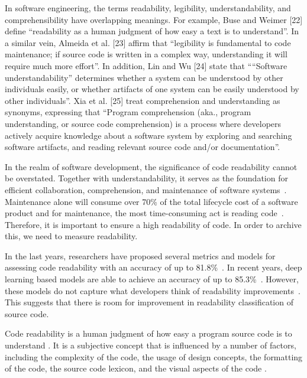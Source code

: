 \documentclass[%
class=scrreprt,
chapterprefix=false,%
open=right,%
twoside=false,%
paper=a4,%
logofile={Logo\_zentral\_farbig\_EN.png},%
thesistype=master,%
UKenglish,%
]{se2thesis}
\begin{document}
	In software engineering, the terms readability, legibility, understandability, and comprehensibility have overlapping meanings. For example, Buse and Weimer [22] define “readability
	as a human judgment of how easy a text is to understand”.
	In a similar vein, Almeida et al. [23] affirm that “legibility is
	fundamental to code maintenance; if source code is written
	in a complex way, understanding it will require much more
	effort”. In addition, Lin and Wu [24] state that ““Software
	understandability” determines whether a system can be understood by other individuals easily, or whether artifacts of
	one system can be easily understood by other individuals”.
	Xia et al. [25] treat comprehension and understanding as
	synonyms, expressing that “Program comprehension (aka.,
	program understanding, or source code comprehension) is a
	process where developers actively acquire knowledge about a
	software system by exploring and searching software artifacts,
	and reading relevant source code and/or documentation”.\cite{oliveira2020evaluating}
	
	
	In the realm of software development, the significance of code readability cannot be overstated. Together with understandability, it serves as the foundation for efficient collaboration, comprehension, and maintenance of software systems~\cite{posnett2011simpler, aggarwal2002integrated}. 
	Maintenance alone will consume over 70\% of the total lifecycle cost of a software product and for maintenance, the most time-consuming act is reading code~\cite{buse2009learning, deimel1985uses, rugaber2000use, boehm2001defect}.
	Therefore, it is important to ensure a high readability of code. In order to archive this, we need to measure readability.
	
	In the last years, researchers have proposed several metrics and models for assessing code readability with an accuracy of up to 81.8\%~\cite{buse2009learning, posnett2011simpler, dorn2012general, daka2015modeling}. In recent years, deep learning based models are able to achieve an accuracy of up to 85.3\%~\cite{mi2018improving, mi2022towards}.
	However, these models do not capture what developers think of readability improvements~\cite{fakhoury2019improving}. This suggests that there is room for improvement in readability classification of source code.
	
	
	
	
	
	
	Code readability is a human judgment of how easy a program source code is to understand \cite{buse2008evaluating}. It is a subjective concept that is influenced by a number of factors, including the complexity of the code, the usage of design concepts, the formatting of the code, the source code lexicon, and the visual aspects of the code \cite{scalabrino2018comprehensive}.
	
\end{document}
